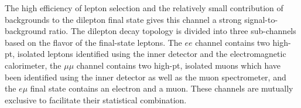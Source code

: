 
The high efficiency of lepton selection and the relatively small contribution of backgrounds
to the dilepton final state %
gives this channel a strong signal-to-background ratio.
The dilepton decay topology is divided into three sub-channels based on the flavor of the
final-state leptons.
The $ee$ channel contains two high-pt, isolated leptons identified using 
the inner detector and the electromagnetic calorimeter, the $\mu\mu$ channel contains two
high-pt, isolated muons which have been identified using the inner detector as well as the muon
spectrometer, and the $e \mu$ final state contains an electron and a muon.
These channels are mutually exclusive to facilitate their statistical combination.



